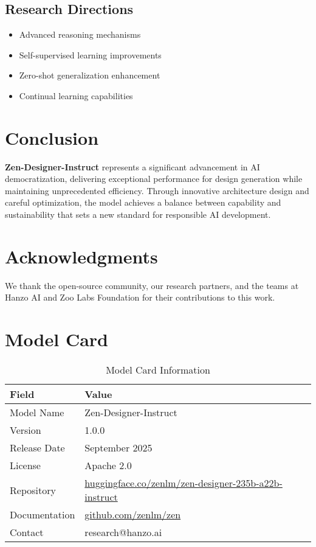 \documentclass[11pt,a4paper]{article}
\begin{document}
\subsection{Research Directions}
\begin{itemize}
    \item Advanced reasoning mechanisms
    \item Self-supervised learning improvements
    \item Zero-shot generalization enhancement
    \item Continual learning capabilities
\end{itemize}

\section{Conclusion}

\textbf{Zen-Designer-Instruct} represents a significant advancement in AI democratization, 
delivering exceptional performance for design generation while maintaining 
unprecedented efficiency. Through innovative architecture design and careful optimization, 
the model achieves a balance between capability and sustainability that sets a new standard 
for responsible AI development.

\section*{Acknowledgments}

We thank the open-source community, our research partners, and the teams at Hanzo AI and 
Zoo Labs Foundation for their contributions to this work.




\appendix

\section{Model Card}

\begin{table}[H]
\centering
\begin{tabular}{ll}
\toprule
\textbf{Field} & \textbf{Value} \\
\midrule
Model Name & Zen-Designer-Instruct \\
Version & 1.0.0 \\
Release Date & September 2025 \\
License & Apache 2.0 \\
Repository & \href{https://huggingface.co/zenlm/zen-designer-235b-a22b-instruct}{huggingface.co/zenlm/zen-designer-235b-a22b-instruct} \\
Documentation & \href{https://github.com/zenlm/zen}{github.com/zenlm/zen} \\
Contact & research@hanzo.ai \\
\bottomrule
\end{tabular}
\caption{Model Card Information}
\end{table}
\end{document}
